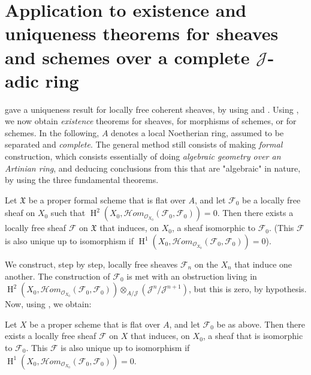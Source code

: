 \section{Application to existence and uniqueness theorems for sheaves and schemes over a complete $\mathcal{J}$-adic ring}\label{fga2-6}


 gave a uniqueness result for locally free coherent sheaves, by using  and .
Using , we now obtain \emph{existence} theorems for sheaves, for morphisms of schemes, or for schemes.
In the following, $A$ denotes a local Noetherian ring, assumed to be separated and \emph{complete}.
The general method still consists of making \emph{formal} construction, which consists essentially of doing \emph{algebraic geometry over an Artinian ring}, and deducing conclusions from this that are "algebraic" in nature, by using the three fundamental theorems.

\begin{proposition}\label{fga2-proposition-3}
    Let $\mathfrak{X}$ be a proper formal scheme that is flat over $A$, and let $\mathcal{F}_0$ be a locally free sheaf on $X_0$ such that $\operatorname{H}^2(X_0,\mathcal{H}om_{\mathcal{O}_{X_0}}(\mathcal{F}_0,\mathcal{F}_0))=0$.
    Then there exists a locally free sheaf $\mathcal{F}$ on $\mathfrak{X}$ that induces, on $X_0$, a sheaf isomorphic to $\mathcal{F}_0$.
    (This $\mathcal{F}$ is also unique up to isomorphism if $\operatorname{H}^1(X_0,\mathcal{H}om_{\mathcal{O}_{X_0}}(\mathcal{F}_0,\mathcal{F}_0))=0$).
\end{proposition}

We construct, step by step, locally free sheaves $\mathcal{F}_n$ on the $X_n$ that induce one another.
The construction of $\mathcal{F}_0$ is met with an obstruction living in $\operatorname{H}^2(X_0,\mathcal{H}om_{\mathcal{O}_{X_0}}(\mathcal{F}_0,\mathcal{F}_0))\otimes_{A/\mathcal{J}}(\mathcal{J}^n/\mathcal{J}^{n+1})$, but this is zero, by hypothesis.
Now, using , we obtain:

\begin{corollary}\label{fga2-proposition-3-corollary-1}
    Let $X$ be a proper scheme that is flat over $A$, and let $\mathcal{F}_0$ be as above.
    Then there exists a locally free sheaf $\mathcal{F}$ on $X$ that induces, on $X_0$, a sheaf that is isomorphic to $\mathcal{F}_0$.
    This $\mathcal{F}$ is also unique up to isomorphism if $\operatorname{H}^1(X_0,\mathcal{H}om_{\mathcal{O}_{X_0}}(\mathcal{F}_0,\mathcal{F}_0))=0$.
\end{corollary}

